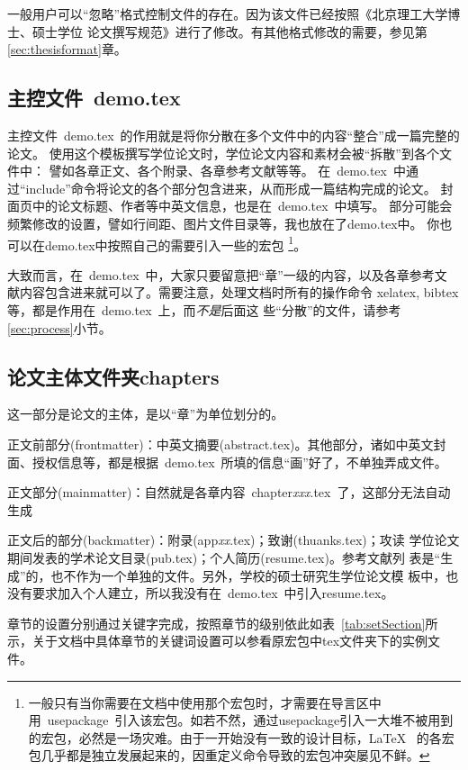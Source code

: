 一般用户可以``忽略''格式控制文件的存在。因为该文件已经按照《北京理工大学博士、硕士学位
论文撰写规范》进行了修改。有其他格式修改的需要，参见第\ref{sec:thesisformat}章。


\subsection{主控文件~demo.tex}
\label{sec:demotex}

主控文件~demo.tex~的作用就是将你分散在多个文件中的内容``整合''成一篇完整的论文。
使用这个模板撰写学位论文时，学位论文内容和素材会被``拆散''到各个文件中：
譬如各章正文、各个附录、各章参考文献等等。
在~demo.tex~中通过``include''命令将论文的各个部分包含进来，从而形成一篇结构完成的论文。
封面页中的论文标题、作者等中英文信息，也是在~demo.tex~中填写。
部分可能会频繁修改的设置，譬如行间距、图片文件目录等，我也放在了demo.tex中。
你也可以在demo.tex中按照自己的需要引入一些的宏包
\footnote{一般只有当你需要在文档中使用那个宏包时，才需要在导言区中用~usepackage~引入该宏包。如若不然，通过usepackage引入一大堆不被用到的宏包，必然是一场灾难。由于一开始没有一致的设计目标，\LaTeX~ 的各宏包几乎都是独立发展起来的，因重定义命令导致的宏包冲突屡见不鲜。}。

大致而言，在~demo.tex~中，大家只要留意把``章''一级的内容，以及各章参考文
献内容包含进来就可以了。需要注意，处理文档时所有的操作命令
{}\cndash{}xelatex, bibtex等，都是作用在~demo.tex~上，而\emph{不是}后面这
些``分散''的文件，请参考\ref{sec:process}小节。



\subsection{论文主体文件夹chapters}
\label{sec:thesisbody}

这一部分是论文的主体，是以``章''为单位划分的。

正文前部分(frontmatter)：中英文摘要(abstract.tex)。其他部分，诸如中英文封
面、授权信息等，都是根据~demo.tex~所填的信息``画''好了，不单独弄成文件。

正文部分(mainmatter)：自然就是各章内容~chapter\emph{xxx}.tex~了，这部分无法自动生成

正文后的部分(backmatter)：附录(app\emph{xx}.tex)；致谢(thuanks.tex)；攻读
学位论文期间发表的学术论文目录(pub.tex)；个人简历(resume.tex)。参考文献列
表是``生成''的，也不作为一个单独的文件。另外，学校的硕士研究生学位论文模
板中，也没有要求加入个人建立，所以我没有在~demo.tex~中引入resume.tex。

章节的设置分别通过关键字完成，按照章节的级别依此如表~\ref{tab:setSection}所示，关于文档中具体章节的关键词设置可以参看原宏包中tex文件夹下的实例文件。



